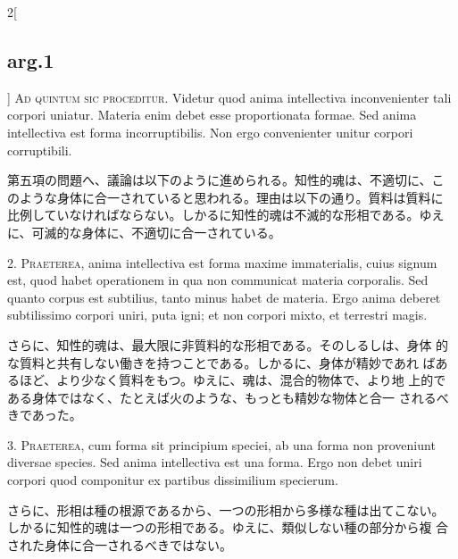 \documentclass[paper=a4paper,fontsize=10pt,jafontsize=9pt,titlepage]{jlreq}
\begin{document}
\begin{paracol}{2}[\subsection{arg.1}]
 {\scshape Ad quintum sic proceditur}. Videtur quod anima intellectiva
 inconvenienter tali corpori uniatur. Materia enim debet esse
 proportionata formae. Sed anima intellectiva est forma
 incorruptibilis. Non ergo convenienter unitur corpori corruptibili.
 
\switchcolumn

第五項の問題へ、議論は以下のように進められる。知性的魂は、不適切に、こ
のような身体に合一されていると思われる。理由は以下の通り。質料は質料に
比例していなければならない。しかるに知性的魂は不滅的な形相である。ゆえ
に、可滅的な身体に、不適切に合一されている。
 


 2. {\scshape Praeterea}, anima intellectiva est forma maxime
 immaterialis, cuius signum est, quod habet operationem in qua non
 communicat materia corporalis. Sed quanto corpus est subtilius, tanto
 minus habet de materia. Ergo anima deberet subtilissimo corpori
 uniri, puta igni; et non corpori mixto, et terrestri magis.
 
\switchcolumn

 さらに、知性的魂は、最大限に非質料的な形相である。そのしるしは、身体
 的な質料と共有しない働きを持つことである。しかるに、身体が精妙であれ
 ばあるほど、より少なく質料をもつ。ゆえに、魂は、混合的物体で、より地
 上的である身体ではなく、たとえば火のような、もっとも精妙な物体と合一
 されるべきであった。

3. {\scshape Praeterea}, cum forma sit principium speciei, ab una
forma non proveniunt diversae species. Sed anima intellectiva est una
forma. Ergo non debet uniri corpori quod componitur ex partibus
dissimilium specierum.
 
\switchcolumn

 さらに、形相は種の根源であるから、一つの形相から多様な種は出てこない。
 しかるに知性的魂は一つの形相である。ゆえに、類似しない種の部分から複
 合された身体に合一されるべきではない。


\end{paracol}
\end{document}
